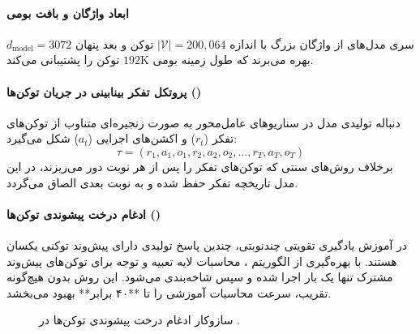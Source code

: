 \item {}

\paragraph*{ابعاد واژگان و بافت بومی}
سری مدل‌های  \cite{minimax2026m2} از واژگان بزرگ با اندازه $|\mathcal{V}| = 200{,}064$ توکن و بعد پنهان $d_{\text{model}} = 3072$ بهره می‌برند که طول زمینه بومی $192\text{K}$ توکن را پشتیبانی می‌کند.

\paragraph*{پروتکل تفکر بینابینی در جریان توکن‌ها ()}
دنباله تولیدی مدل در سناریوهای عامل‌محور به صورت زنجیره‌ای متناوب از توکن‌های تفکر ($r_t$) و اکشن‌های اجرایی ($a_t$) شکل می‌گیرد:
\begin{equation}
    \tau = (r_1, a_1, o_1, r_2, a_2, o_2, \dots, r_T, a_T, o_T)
\end{equation}
برخلاف روش‌های سنتی که توکن‌های تفکر را پس از هر نوبت دور می‌ریزند، در این مدل تاریخچه تفکر حفظ شده و به نوبت بعدی الصاق می‌گردد.

\paragraph*{ادغام درخت پیشوندی توکن‌ها ()}
در آموزش یادگیری تقویتی چندنوبتی، چندین پاسخ تولیدی دارای پیش‌وند توکنی یکسان هستند. با بهره‌گیری از الگوریتم ، محاسبات لایه تعبیه و توجه برای توکن‌های پیش‌وند مشترک تنها یک بار اجرا شده و سپس شاخه‌بندی می‌شود. این روش بدون هیچ‌گونه تقریب، سرعت محاسبات آموزشی را تا **۴۰ برابر** بهبود می‌بخشد.

\begin{figure}[htbp]
\centering
{}
\caption{سازوکار ادغام درخت پیشوندی توکن‌ها در .}
\label{fig:minimax_prefix_tree}
\end{figure}